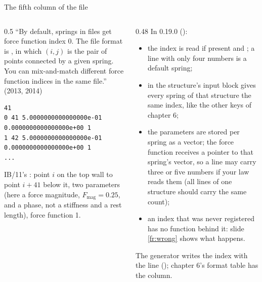 \documentclass[aspectratio=169,11pt]{beamer}
\begin{document}
\begin{frame}[fragile]{The fifth column of the  file}
\label{fr:column}
\begin{columns}[T,onlytextwidth]
\begin{column}{0.5\textwidth}
\footnotesize ``By default, springs in  files get force function index 0. The  file format is , in which $(i, j)$ is the pair of points connected by a given spring. You can mix-and-match different force function indices in the same  file.'' (2013, 2014)
\begin{lstlisting}[style=data]
41
0 41 5.0000000000000000e-01 0.0000000000000000e+00 1
1 42 5.0000000000000000e-01 0.0000000000000000e+00 1
...
\end{lstlisting}
\footnotesize IB/11's : point $i$ on the top wall to point $i + 41$ below it, two parameters (here a force magnitude, $F_{\mathrm{mag}} = 0.25$, and a phase, not a stiffness and a rest length), force function 1.
\end{column}
\begin{column}{0.48\textwidth}
\footnotesize In 0.19.0 ():
\begin{itemize}
  \item the index is read if present and ; a line with only four numbers is a default spring;
  \item {} in the structure's input block gives every spring of that structure the same index, like the other  keys of chapter 6;
  \item the parameters are stored per spring as a vector; the force function receives a pointer to that spring's vector, so a line may carry three or five numbers if your law reads them (all lines of one structure should carry the same count);
  \item an index that was never registered has no function behind it: slide \ref{fr:wrong} shows what happens.
\end{itemize}
\footnotesize The generator writes the index with the line (); chapter 6's format table has the column.
\end{column}
\end{columns}
\end{frame}
\end{document}
